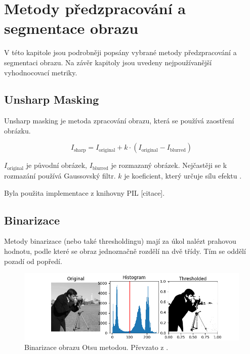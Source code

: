 \chapter{Metody předzpracování a segmentace obrazu}

V této kapitole jsou podrobněji popsány vybrané metody předzpracování a segmentaci obrazu.
Na závěr kapitoly jsou uvedeny nejpoužívanější vyhodnocovací metriky.

\section{Unsharp Masking}

Unsharp masking je metoda zpracování obrazu, která se používá zaostření obrázku.

\begin{equation}
    I_{\text{sharp}} = I_{\text{original}} + k \cdot (I_{\text{original}} - I_{\text{blurred}})
\end{equation}

$I_{\text{original}}$ je původní obrázek, $I_{\text{blurred}}$ je rozmazaný obrázek. Nejčastěji se k rozmazání používá Gaussovský filtr. $k$ je koeficient, který určuje sílu efektu \cite{gQ8rTS6z7UD6hnlM}.

Byla použita implementace z knihovny PIL [citace].

\section{Binarizace}

Metody binarizace (nebo také thresholdingu) mají za úkol nalézt prahovou hodnotu, podle které se obraz jednoznačně rozdělí na dvě třídy. Tím se oddělí pozadí od popředí.

\begin{figure}[H]
    \centering
    \includegraphics[width=\textwidth]{static/obrazky/thresholding_example.png}
    \caption{Binarizace obrazu Otsu metodou. Převzato z \cite{NEbfP3AWk7ALQfWN}.}
    \label{fig:thresholding}
\end{figure}

